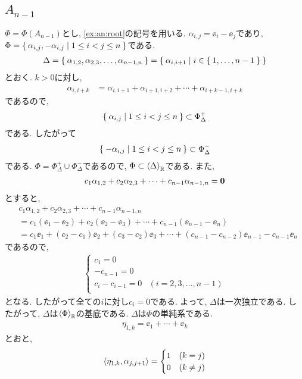 \subsection{$A_{n-1}$}
\label{ex:an:simple}
$\Phi=\Phi(A_{n-1})$とし,
\cref{ex:an:root}の記号を用いる.
$\alpha_{i,j}=\ee_i-\ee_j$であり, $\Phi=\Set{\alpha_{i,j}, -\alpha_{i,j}|1\leq i<j\leq n}$である.
\begin{align*}
  \Delta=\Set{\alpha_{1,2},\alpha_{2,3},\ldots,\alpha_{n-1,n}}=\Set{\alpha_{i,i+1}|i\in\Set{1,\ldots,n-1}}
\end{align*}
とおく.
$k>0$に対し,
\begin{align*}
\alpha_{i,i+k}&=\alpha_{i,i+1}+\alpha_{i+1,i+2}+\cdots+\alpha_{i+k-1,i+k}
\end{align*}
であるので,
\begin{align*}
  \Set{\alpha_{i,j}|1\leq i<j\leq n}\subset \Phi_\Delta^+
\end{align*}
である.  したがって
\begin{align*}
  \Set{-\alpha_{i,j}|1\leq i<j\leq n}\subset \Phi_\Delta^-
\end{align*}
である.
$\Phi=\Phi_\Delta^+\cup \Phi_\Delta^-$であるので,
$\Phi\subset \Braket{\Delta}_{\mathbb{R}}$である.
また,
\begin{align*}
  c_1\alpha_{1,2}+c_2\alpha_{2,3}+\cdots+c_{n-1}\alpha_{n-1,n}=\boldsymbol{0}
\end{align*}
とすると,
\begin{align*}
  &c_1\alpha_{1,2}+c_2\alpha_{2,3}+\cdots+c_{n-1}\alpha_{n-1,n}\\
  &=c_1(\ee_1-\ee_2)+c_2(\ee_2-\ee_3)+\cdots+c_{n-1}(\ee_{n-1}-\ee_n)\\
  &=c_1\ee_1+(c_2-c_1)\ee_2+(c_3-c_2)\ee_3+\cdots+(c_{n-1}-c_{n-2})\ee_{n-1}-c_{n-1}\ee_n
\end{align*}
であるので,
\begin{align*}
  \begin{cases}
    c_1=0 &\\
    -c_{n-1}=0 &\\
    c_i-c_{i-1}=0 &(i=2,3,\ldots,n-1)\\
  \end{cases}
\end{align*}
となる.
したがって全ての$i$に対し$c_i=0$である.
よって, $\Delta$は一次独立である.
したがって, $\Delta$は$\Braket{\Phi}_{\mathbb{R}}$の基底である.
$\Delta$は$\Phi$の単純系である.
\begin{align*}
  \eta_{1,k}=\ee_1+\cdots+\ee_k
\end{align*}
とおと,
\begin{align*}
  \Braket{\eta_{1,k},\alpha_{j,j+1}}=
  \begin{cases}
    1 &(k=j)\\
    0 &(k\neq j)
  \end{cases}
\end{align*}
